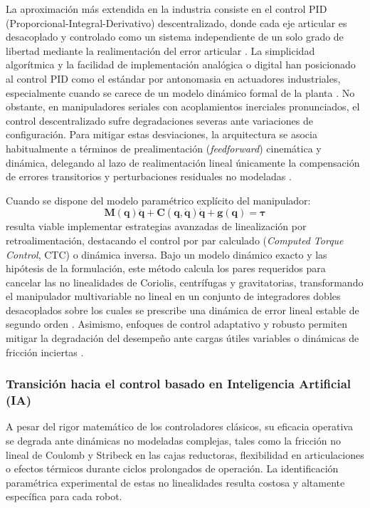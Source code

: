 \documentclass[12pt]{article}
\begin{document}
La aproximación más extendida en la industria consiste en el control PID (Proporcional-Integral-Derivativo) descentralizado, donde cada eje articular es desacoplado y controlado como un sistema independiente de un solo grado de libertad mediante la realimentación del error articular \cite{modern_robotics}. La simplicidad algorítmica y la facilidad de implementación analógica o digital han posicionado al control PID como el estándar por antonomasia en actuadores industriales, especialmente cuando se carece de un modelo dinámico formal de la planta \cite{modern_robotics}. No obstante, en manipuladores seriales con acoplamientos inerciales pronunciados, el control descentralizado sufre degradaciones severas ante variaciones de configuración. Para mitigar estas desviaciones, la arquitectura se asocia habitualmente a términos de prealimentación (\textit{feedforward}) cinemática y dinámica, delegando al lazo de realimentación lineal únicamente la compensación de errores transitorios y perturbaciones residuales no modeladas \cite{modern_robotics, Spong}.

Cuando se dispone del modelo paramétrico explícito del manipulador:
\begin{equation}
\bm{M}(\bm{q})\ddot{\bm{q}} + \bm{C}(\bm{q}, \dot{\bm{q}})\dot{\bm{q}} + \bm{g}(\bm{q}) = \bm{\tau}
\label{eqt:equation1}
\end{equation}
resulta viable implementar estrategias avanzadas de linealización por retroalimentación, destacando el control por par calculado (\textit{Computed Torque Control}, CTC) o dinámica inversa. Bajo un modelo dinámico exacto y las hipótesis de la formulación, este método calcula los pares requeridos para cancelar las no linealidades de Coriolis, centrífugas y gravitatorias, transformando el manipulador multivariable no lineal en un conjunto de integradores dobles desacoplados sobre los cuales se prescribe una dinámica de error lineal estable de segundo orden \cite{modern_robotics, Spong}. Asimismo, enfoques de control adaptativo y robusto permiten mitigar la degradación del desempeño ante cargas útiles variables o dinámicas de fricción inciertas \cite{modern_robotics}.

\subsubsection*{Transición hacia el control basado en Inteligencia Artificial (IA)}
A pesar del rigor matemático de los controladores clásicos, su eficacia operativa se degrada ante dinámicas no modeladas complejas, tales como la fricción no lineal de Coulomb y Stribeck en las cajas reductoras, flexibilidad en articulaciones o efectos térmicos durante ciclos prolongados de operación. La identificación paramétrica experimental de estas no linealidades resulta costosa y altamente específica para cada robot.
\end{document}
